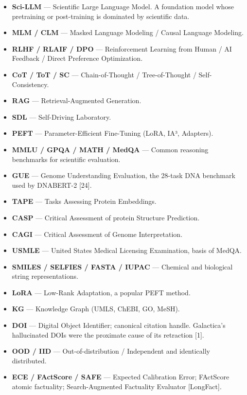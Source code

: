 \begin{itemize}
\tightlist
\item
  \textbf{Sci-LLM} --- Scientific Large Language Model. A foundation model whose pretraining or post-training is dominated by scientific data.
\item
  \textbf{MLM / CLM} --- Masked Language Modeling / Causal Language Modeling.
\item
  \textbf{RLHF / RLAIF / DPO} --- Reinforcement Learning from Human / AI Feedback / Direct Preference Optimization.
\item
  \textbf{CoT / ToT / SC} --- Chain-of-Thought / Tree-of-Thought / Self-Consistency.
\item
  \textbf{RAG} --- Retrieval-Augmented Generation.
\item
  \textbf{SDL} --- Self-Driving Laboratory.
\item
  \textbf{PEFT} --- Parameter-Efficient Fine-Tuning (LoRA, IA³, Adapters).
\item
  \textbf{MMLU / GPQA / MATH / MedQA} --- Common reasoning benchmarks for scientific evaluation.
\item
  \textbf{GUE} --- Genome Understanding Evaluation, the 28-task DNA benchmark used by DNABERT-2 {[}24{]}.
\item
  \textbf{TAPE} --- Tasks Assessing Protein Embeddings.
\item
  \textbf{CASP} --- Critical Assessment of protein Structure Prediction.
\item
  \textbf{CAGI} --- Critical Assessment of Genome Interpretation.
\item
  \textbf{USMLE} --- United States Medical Licensing Examination, basis of MedQA.
\item
  \textbf{SMILES / SELFIES / FASTA / IUPAC} --- Chemical and biological string representations.
\item
  \textbf{LoRA} --- Low-Rank Adaptation, a popular PEFT method.
\item
  \textbf{KG} --- Knowledge Graph (UMLS, ChEBI, GO, MeSH).
\item
  \textbf{DOI} --- Digital Object Identifier; canonical citation handle. Galactica's hallucinated DOIs were the proximate cause of its retraction {[}1{]}.
\item
  \textbf{OOD / IID} --- Out-of-distribution / Independent and identically distributed.
\item
  \textbf{ECE / FActScore / SAFE} --- Expected Calibration Error; FActScore atomic factuality; Search-Augmented Factuality Evaluator {[}LongFact{]}.
\end{itemize}

